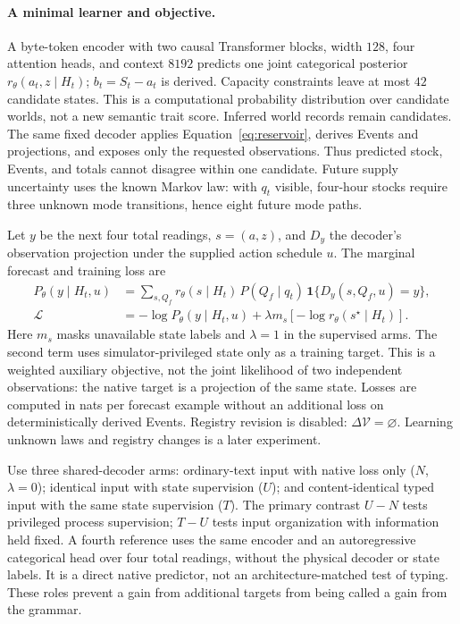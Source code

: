 \documentclass[10pt]{article}
\begin{document}
\paragraph{A minimal learner and objective.}
A byte-token encoder with two causal Transformer blocks, width $128$, four
attention heads, and context $8192$ predicts one joint categorical posterior
$r_\theta(a_t,z\mid H_t)$; $b_t=S_t-a_t$ is derived. Capacity constraints leave
at most $42$ candidate states. This is a computational probability
distribution over candidate worlds, not a new semantic trait score. Inferred
world records remain candidates. The same fixed decoder applies
Equation~\ref{eq:reservoir}, derives Events and projections, and exposes only
the requested observations. Thus predicted stock, Events, and totals cannot
disagree within one candidate. Future supply uncertainty uses the known
Markov law: with $q_t$ visible, four-hour stocks require three unknown mode
transitions, hence eight future mode paths.

Let $y$ be the next four total readings, $s=(a,z)$, and $D_y$ the decoder's
observation projection under the supplied action schedule $u$. The marginal
forecast and training loss are
\begin{align}
 P_\theta(y\mid H_t,u)
 &=\sum_{s,Q_f}r_\theta(s\mid H_t)\,P(Q_f\mid q_t)\,
       \mathbf 1\{D_y(s,Q_f,u)=y\}, \label{eq:reservoir-marginal}\\
 \mathcal L
 &=-\log P_\theta(y\mid H_t,u)
       +\lambda m_s[-\log r_\theta(s^\star\mid H_t)] .
 \label{eq:reservoir-loss}
\end{align}
Here $m_s$ masks unavailable state labels and $\lambda=1$ in the supervised
arms. The second term uses simulator-privileged state only as a training
target. This is a weighted auxiliary objective, not the joint likelihood of
two independent observations: the native target is a projection of the same
state. Losses are computed in nats per forecast example without an additional
loss on deterministically derived Events. Registry revision is disabled:
$\Delta\mathcal V=\varnothing$. Learning unknown laws and registry changes is
a later experiment.

Use three shared-decoder arms: ordinary-text input with native loss only
($N$, $\lambda=0$); identical input with state supervision ($U$); and
content-identical typed input with the same state supervision ($T$).
The primary contrast $U-N$ tests privileged process supervision; $T-U$ tests
input organization with information held fixed. A fourth reference uses the
same encoder and an autoregressive categorical head over four total readings,
without the physical decoder or state labels. It is a direct native predictor,
not an architecture-matched test of typing. These roles prevent a gain from
additional targets from being called a gain from the grammar.
\end{document}
